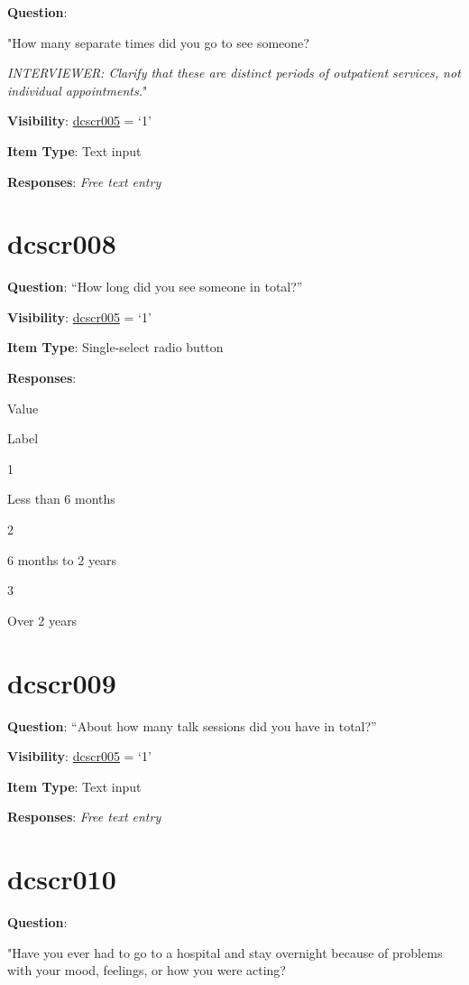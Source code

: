 \documentclass[]{book}
\begin{document}
\textbf{Question}:

"How many separate times did you go to see someone?

\emph{INTERVIEWER: Clarify that these are distinct periods of outpatient services, not individual appointments.}"

\textbf{Visibility}: \protect\hyperlink{dcscr005}{dcscr005} = `1'

\textbf{Item Type}: Text input

\textbf{Responses}: \emph{Free text entry}

\hypertarget{dcscr008}{%
\section{dcscr008}\label{dcscr008}}

\textbf{Question}: ``How long did you see someone in total?''

\textbf{Visibility}: \protect\hyperlink{dcscr005}{dcscr005} = `1'

\textbf{Item Type}: Single-select radio button

\textbf{Responses}:

Value

Label

1

Less than 6 months

2

6 months to 2 years

3

Over 2 years

\hypertarget{dcscr009}{%
\section{dcscr009}\label{dcscr009}}

\textbf{Question}: ``About how many talk sessions did you have in total?''

\textbf{Visibility}: \protect\hyperlink{dcscr005}{dcscr005} = `1'

\textbf{Item Type}: Text input

\textbf{Responses}: \emph{Free text entry}

\hypertarget{dcscr010}{%
\section{dcscr010}\label{dcscr010}}

\textbf{Question}:

"Have you ever had to go to a hospital and stay overnight because of problems with your mood, feelings, or how you were acting?
\end{document}
